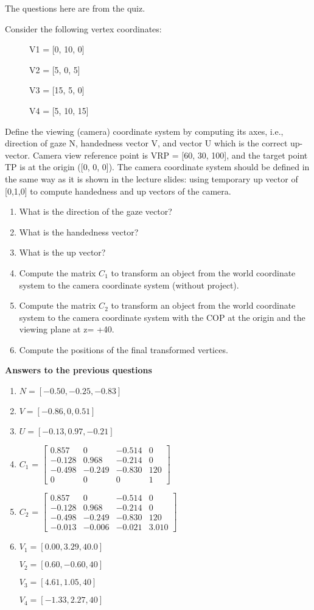 The questions here are from the quiz.

Consider the following vertex coordinates:
\begin{figure}[!hbt]
	\centering
	V1 = [0, 10, 0]
	
	V2 = [5, 0, 5]
	
	V3 = [15, 5, 0]
	
	V4 = [5, 10, 15]
\end{figure}

Define the viewing (camera) coordinate system by computing its axes, i.e., direction of gaze N, handedness vector V, and vector U which is the correct up-vector. Camera view reference point is VRP = [60, 30, 100], and the target point TP is at the origin ([0, 0, 0]). The camera coordinate system should be defined in the same way as it is shown in the lecture slides: using temporary up vector of [0,1,0] to compute handedness and up vectors of the camera.
\begin{enumerate}
	\item What is the direction of the gaze vector?
	\item What is the handedness vector?
	\item What is the up vector?
	\item Compute the matrix $C_1$ to transform an object from the world coordinate system to the camera coordinate system (without project).
	\item Compute the matrix $C_2$ to transform an object from the world coordinate system to the camera coordinate system with the COP at the origin and the viewing plane at z= +40.
	\item Compute the positions of the final transformed vertices.
\end{enumerate}
\newpage
\textbf{Answers to the previous questions}
\newline
\begin{enumerate}
	\item $N = [-0.50, -0.25, -0.83]$
	\item $V = [-0.86, 0, 0.51]$
	\item $U = [-0.13, 0.97, -0.21]$
	\item $C_1$ = $\begin{bmatrix}
		0.857 & 0 & -0.514 & 0\\ 
		-0.128 & 0.968 & -0.214 & 0\\ 
		-0.498 & -0.249 & -0.830 & 120\\
		0 & 0 & 0 & 1 
	\end{bmatrix}$
		\item $C_2$ = $\begin{bmatrix}
	0.857 & 0 & -0.514 & 0\\ 
	-0.128 & 0.968 & -0.214 & 0\\ 
	-0.498 & -0.249 & -0.830 & 120\\
	-0.013 & -0.006 & -0.021 & 3.010 
	\end{bmatrix}$
	\item $V_1 = [0.00, 3.29, 40.0]$
	
	$V_2 = [0.60, -0.60, 40]$
	
	$V_3 = [4.61, 1.05, 40]$
	
	$V_4 = [-1.33, 2.27, 40]$
\end{enumerate}
